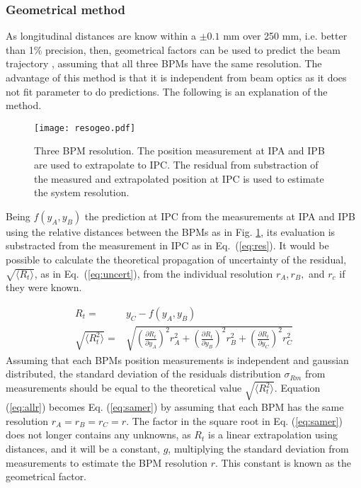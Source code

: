 \subsubsection{Geometrical method}
As longitudinal distances are know within a $\pm0.1$ mm over 250 mm, i.e. better than 1\% precision, then, geometrical factors can be used to predict the beam trajectory \cite{Nakamura:2008}, assuming that all three BPMs have the same resolution. The advantage of this method is that it is independent from beam optics as it does not fit parameter to do predictions. The following is an explanation of the method.\par
\begin{figure}[htb]
 \centering
 \texttt{[image: resogeo.pdf]}\caption{Three BPM resolution. The position measurement at IPA and IPB are used to extrapolate to IPC. The residual from substraction of the measured and extrapolated position at IPC is used to estimate the system resolution.}\label{f:3BPMreso}
\end{figure}
Being $f(y_A,y_B)$ the prediction at IPC from the measurements at IPA and IPB using the relative distances between the BPMs as in Fig. \ref{f:3BPMreso}, its evaluation is substracted from the measurement in IPC as in Eq.~(\ref{eq:res}). It would be possible to calculate the theoretical propagation of uncertainty of the residual, $\sqrt{\langle R_t\rangle}$, as in Eq.~(\ref{eq:uncert}), from the individual resolution $r_A,r_B,$ and $r_c$ if they were known.\par
 \begin{align}
 R_t=& y_C - f(y_A,y_B)\label{eq:res}\\
  \sqrt{\langle R_t^2\rangle} =& \sqrt{\left(\frac{\partial R_t}{\partial y_A}\right)^2r_A^2+\left(\frac{\partial R_t}{\partial y_B}\right)^2r_B^2+\left(\frac{\partial R_t}{\partial y_C}\right)^2r_C^2}\label{eq:uncert}
 \end{align}
Assuming that each BPMs position measurements is independent and gaussian distributed, the standard deviation of the residuals distribution $\sigma_{Rm}$ from measurements should be equal to the theoretical value $\sqrt{\langle R_t^2\rangle}$. Equation (\ref{eq:allr}) becomes Eq. (\ref{eq:samer}) by assuming that each BPM has the same resolution $r_A=r_B=r_C=r$. The factor in the square root in Eq. (\ref{eq:samer}) does not longer contains any unknowns, as $R_t$ is a linear extrapolation using distances, and it will be a constant, $g$, multiplying the standard deviation from measurements to estimate the BPM resolution $r$. This constant is known as the geometrical factor.\par

